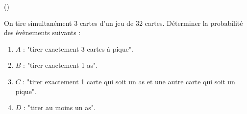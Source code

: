 \begin{exercice}\label{exo3-6} (\boringexo)

On tire simultan\'ement 3 cartes d'un jeu de 32 cartes. D\'eterminer la probabilit\'e 
des \'ev\`enements suivants :

\begin{enumerate}

\item $A$ : "tirer exactement 3 cartes \`a pique".

\item $B$ : "tirer exactement 1 as".

\item $C$ : "tirer exactement 1 carte qui soit un as et une autre carte qui soit un pique".

\item $D$ : "tirer au moins un as".

\end{enumerate}

\end{exercice}
